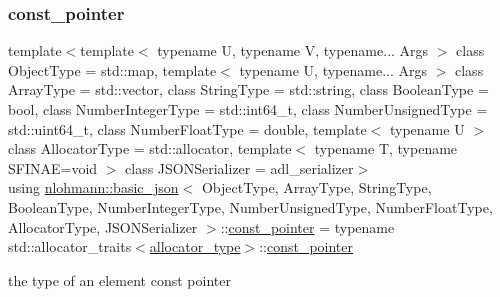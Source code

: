 \subsubsection{\texorpdfstring{const\_pointer}{const\_pointer}}
{\footnotesize\ttfamily template$<$template$<$ typename U, typename V, typename... Args $>$ class Object\+Type = std\+::map, template$<$ typename U, typename... Args $>$ class Array\+Type = std\+::vector, class String\+Type  = std\+::string, class Boolean\+Type  = bool, class Number\+Integer\+Type  = std\+::int64\+\_\+t, class Number\+Unsigned\+Type  = std\+::uint64\+\_\+t, class Number\+Float\+Type  = double, template$<$ typename U $>$ class Allocator\+Type = std\+::allocator, template$<$ typename T, typename S\+F\+I\+N\+A\+E=void $>$ class J\+S\+O\+N\+Serializer = adl\+\_\+serializer$>$ \\
using \mbox{\hyperlink{classnlohmann_1_1basic__json}{nlohmann\+::basic\+\_\+json}}$<$ Object\+Type, Array\+Type, String\+Type, Boolean\+Type, Number\+Integer\+Type, Number\+Unsigned\+Type, Number\+Float\+Type, Allocator\+Type, J\+S\+O\+N\+Serializer $>$\+::\mbox{\hyperlink{classnlohmann_1_1basic__json_aff3d5cd2a75612364b888d8693231b58}{const\+\_\+pointer}} =  typename std\+::allocator\+\_\+traits$<$\mbox{\hyperlink{classnlohmann_1_1basic__json_a86ce930490cf7773b26f5ef49c04a350}{allocator\+\_\+type}}$>$\+::\mbox{\hyperlink{classnlohmann_1_1basic__json_aff3d5cd2a75612364b888d8693231b58}{const\+\_\+pointer}}}



the type of an element const pointer 

\mbox{\label{classnlohmann_1_1basic__json_a4057c5425f4faacfe39a8046871786ca}} 
